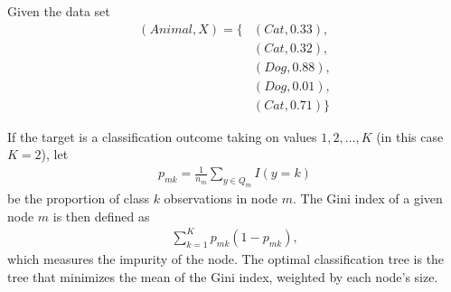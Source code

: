 \documentclass[11pt, oneside]{exam}   	%
\begin{document}
Given the data set
\begin{align*}
	(Animal, X)=\{ & (Cat, 0.33),  \\
	               & (Cat, 0.32),  \\
	               & (Dog, 0.88),  \\
	               & (Dog, 0.01),  \\
	               & (Cat, 0.71)\}
\end{align*}

If the target is a classification outcome taking on values $1,2,\dots,K$ (in this case $K=2$),
let
\begin{align*}
	p_{mk} = \frac{1}{n_m}\sum_{y\in Q_m}I(y=k)
\end{align*}
be the proportion of class $k$ observations in node $m.$
The Gini index of a given node $m$ is then defined as
\begin{align*}
	\sum_{k=1}^Kp_{mk}(1-p_{mk}),
\end{align*}
which measures the impurity of the node.
The optimal classification tree is the tree that minimizes the mean of the  Gini index,
weighted by each node's size.
\end{document}
